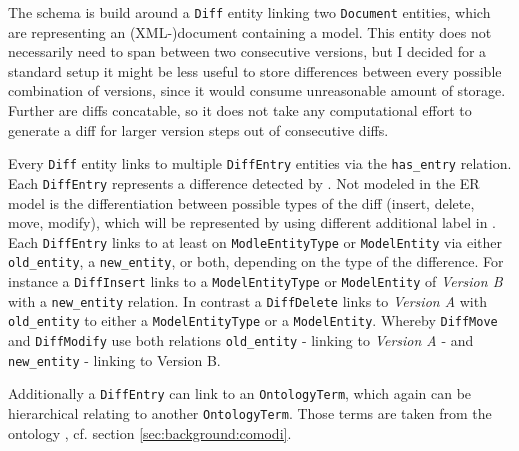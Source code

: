 The schema is build around a \texttt{Diff} entity linking two \texttt{Document} entities, which are representing an (XML-)document containing a model. This entity does not necessarily need to span between two consecutive versions, but I decided for a standard setup it might be less useful to store differences between every possible combination of versions, since it would consume unreasonable amount of storage. Further are diffs concatable, so it does not take any computational effort to generate a diff for larger version steps out of consecutive diffs.

Every \texttt{Diff} entity links to multiple \texttt{DiffEntry} entities via the \texttt{has\_entry} relation. Each \texttt{DiffEntry} represents a difference detected by \bives \cite{Scharm2015}. Not modeled in the ER model is the differentiation between possible types of the diff (insert, delete, move, modify), which will be represented by using different additional label in \neoj.
Each \texttt{DiffEntry} links to at least on \texttt{ModleEntityType} or \texttt{ModelEntity} via either \texttt{old\_entity}, a \texttt{new\_entity}, or both, depending on the type of the difference.
For instance a \texttt{DiffInsert} links to a \texttt{ModelEntityType} or \texttt{ModelEntity} of \emph{Version B} with a \texttt{new\_entity} relation.
In contrast a \texttt{DiffDelete} links to \emph{Version A} with \texttt{old\_entity} to either a \texttt{ModelEntityType} or a \texttt{ModelEntity}. Whereby \texttt{DiffMove} and \texttt{DiffModify} use both relations \texttt{old\_entity} - linking to \emph{Version A} - and \texttt{new\_entity} - linking to Version B.

Additionally a \texttt{DiffEntry} can link to an \texttt{OntologyTerm}, which again can be hierarchical relating to another \texttt{OntologyTerm}. Those terms are taken from the \comodi ontology \cite{Scharm2016}, cf. section \ref{sec:background:comodi}.

